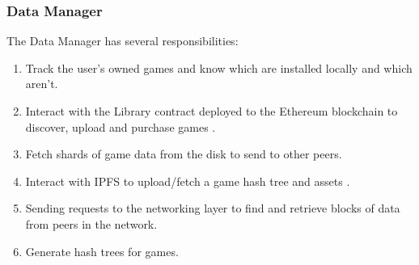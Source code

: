 \subsubsection*{Data Manager}

The Data Manager has several responsibilities:

\begin{enumerate}
  \item Track the user's owned games and know which are installed locally and which aren't.
  \item Interact with the Library contract deployed to the Ethereum blockchain to discover, upload and purchase games   .
  \item Fetch shards of game data from the disk to send to other peers.
  \item Interact with IPFS to upload/fetch a game hash tree and assets  .
  \item Sending requests to the networking layer to find and retrieve blocks of data from peers in the network.
  \item Generate hash trees for games.
\end{enumerate}